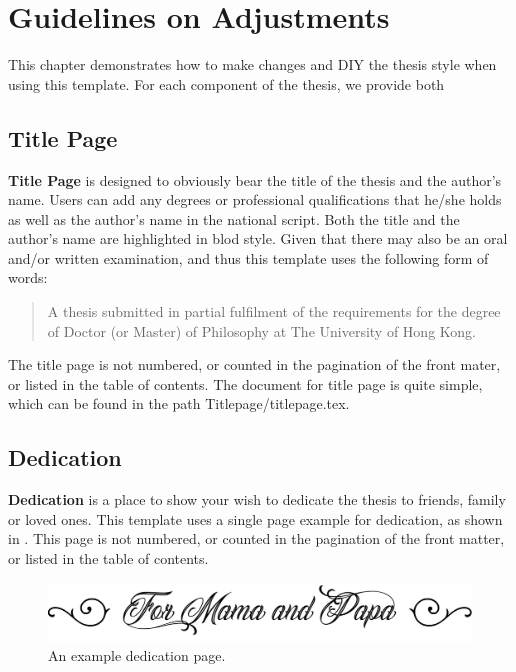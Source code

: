 
\chapter{Guidelines on Adjustments} %

\label{Chapter2} %



This chapter demonstrates how to make changes and DIY the thesis style when using this template. For each component of the thesis, we provide both 

\section{Title Page}
\textbf{Title Page} is designed to obviously bear the title of the thesis and the author's name. Users can add any degrees or professional qualifications that he/she holds as well as the author's name in the national script. Both the title and the author's name are highlighted in blod style. Given that there may also be an oral and/or written examination, and thus this template uses the following form of words:

\begin{quote}
A thesis submitted in partial fulfilment of the requirements for the degree of Doctor (or Master) of Philosophy at The University of Hong Kong.
\end{quote}

\noindent The title page is not numbered, or counted in the pagination of the front mater, or listed in the table of contents. The document for title page is quite simple, which can be found in the path \colorbox{gray!20}{Titlepage/titlepage.tex}.


\section{Dedication}
\label{chap2:sec2:dedication}
\textbf{Dedication} is a place to show your wish to dedicate the thesis to friends, family or loved ones. This template uses a single page example for dedication, as shown in . This page is not numbered, or counted in the pagination of the front matter, or listed in the table of contents.
\begin{figure}
    \centering
    \includegraphics[width=.6\textwidth]{Dedication/dedication.pdf}
    \caption{An example dedication page.}
    \label{fig:chap2:dedication_sample}
\end{figure}


